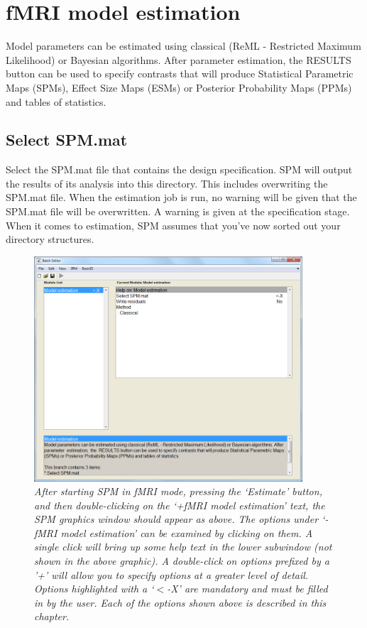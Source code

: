 \chapter{fMRI model estimation}

Model parameters can be estimated using classical (ReML - Restricted Maximum Likelihood) or Bayesian algorithms. After parameter estimation, the RESULTS button can be used to specify contrasts that will produce Statistical Parametric Maps (SPMs), Effect Size Maps (ESMs) or Posterior Probability Maps (PPMs) and tables of statistics. 

\section{Select SPM.mat}
Select the SPM.mat file that contains the design specification. 
SPM will output the results of its analysis into this directory. This includes overwriting the SPM.mat file.
When the estimation job is run, no warning will be given that the SPM.mat file will be overwritten. 
A warning is given at the specification stage. When it comes to estimation, SPM assumes that you've now sorted out your directory structures.

\begin{figure}
\includegraphics[width=100mm]{fmri_est/est_method}
\caption{\em After starting SPM in fMRI mode, pressing the `Estimate' button, and then double-clicking on the `+fMRI model estimation' text, the SPM graphics window should appear as above. The options under `-fMRI model estimation' can be examined by clicking on them. A single click will bring up some help text in the lower subwindow (not shown in the above graphic). 
A double-click on options prefixed by a '+' will allow you to specify 
options at a greater level of detail. Options highlighted with a `$<$-X' are mandatory and must be filled in by the user. Each of the options shown above is described in this chapter. \label{est}}
\end{figure}


